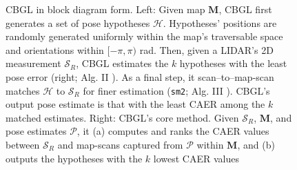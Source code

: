 \begin{figure}\vspace{-0.4cm}
  \subfloat{\label{fig:cbgl}     }
  \subfloat{\label{fig:bottom_k} }
  \caption{\small CBGL in block diagram form. Left: Given map $\bm{M}$, CBGL
           first generates a set of pose hypotheses $\mathcal{H}$. Hypotheses'
           positions are randomly generated uniformly within the map's
           traversable space and orientations within $[-\pi,\pi)$ rad. Then,
           given a LIDAR's 2D measurement $\mathcal{S}_R$, CBGL
           estimates the $k$ hypotheses with the least pose error (right; Alg.
           II \cite{Filotheou2023c}). As a final step, it scan--to--map-scan
           matches $\mathcal{H}$ to $\mathcal{S}_R$ for finer estimation
           (\texttt{sm2}; Alg.
           III \cite{Filotheou2023c}). CBGL's output pose estimate is that with
           the least CAER among the $k$ matched estimates.  Right: CBGL's core
           method. Given $\mathcal{S}_R$, $\bm{M}$, and pose estimates
           $\mathcal{P}$, it (a) computes and ranks the CAER values between
           $\mathcal{S}_R$ and map-scans captured from $\mathcal{P}$ within
           $\bm{M}$, and (b) outputs the hypotheses with the $k$ lowest CAER
           values}
\vspace{-0.5cm}
  \label{fig:block_system}
\end{figure}


